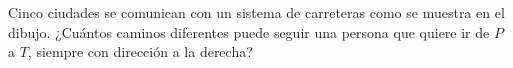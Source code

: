 Cinco ciudades se comunican con un sistema de carreteras como se muestra en el dibujo. ¿Cuántos caminos diferentes puede seguir una persona que quiere ir de $P$ a $T$, siempre con dirección a la derecha?